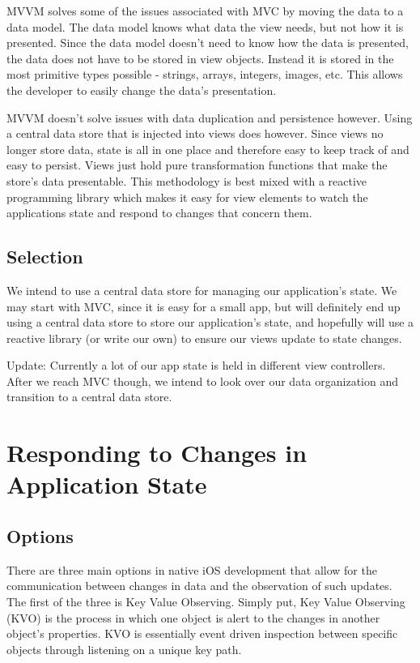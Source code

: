 \documentclass[letterpaper,10pt,titlepage]{article}
\begin{document}
MVVM solves some of the issues associated with MVC by moving the data to a data model. The data model knows what data the view needs, but not how it is presented. Since the data model doesn't need to know how the data is presented, the data does not have to be stored in view objects. Instead it is stored in the most primitive types possible - strings, arrays, integers, images, etc. This allows the developer to easily change the data's presentation.

MVVM doesn't solve issues with data duplication and persistence however. Using a central data store that is injected into views does however. Since views no longer store data, state is all in one place and therefore easy to keep track of and easy to persist. Views just hold pure transformation functions that make the store's data presentable. This methodology is best mixed with a reactive programming library which makes it easy for view elements to watch the applications state and respond to changes that concern them.

\subsection{Selection}
We intend to use a central data store for managing our application's state. We may start with MVC, since it is easy for a small app, but will definitely end up using a central data store to store our application's state, and hopefully will use a reactive library (or write our own) to ensure our views update to state changes.

Update: Currently a lot of our app state is held in different view controllers. After we reach MVC though, we intend to look over our data organization and transition to a central data store.

\section{Responding to Changes in Application State}

\subsection{Options}

There are three main options in native iOS development that allow for the communication between changes in data and the observation of such updates. The first of the three is Key Value Observing. Simply put, Key Value Observing (KVO) is the process in which one object is alert to the changes in another object's properties.\cite{observation2} KVO is essentially event driven inspection between specific objects through listening on a unique key path.\\
\end{document}
